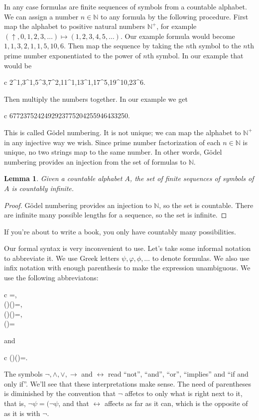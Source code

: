 \documentclass[11pt,oneside,%
]{memoir}
\newenvironment{eqna}{\begin{IEEEeqnarray}{c}}{\end{IEEEeqnarray}\ignorespacesafterend}
\newtheorem{lemma}{Lemma}
\theoremstyle{definition}
\newcommand{\NN}{\mathbb{N}}
\begin{document}
In any case formulas are finite sequences of symbols from a countable alphabet. We can assign a number \(n\in\NN\) to any formula by the following procedure. First map the alphabet to positive natural numbers \(\NN^+\), for example \((\uparrow,0,1,2,3,\dotsc)\mapsto(1,2,3,4,5,\dotsc)\). Our example formula would become \(1,1,3,2,1,1,5,10,6\). Then map the sequence  by taking the \(n\)th symbol to the \(n\)th prime number exponentiated to the power of \(n\)th symbol. In our example that would be
\begin{eqna}
    2^1,3^1,5^3,7^2,11^1,13^1,17^5,19^{10},23^6.
\end{eqna}
Then multiply the numbers together. In our example we get
\begin{eqna}
    6772375242492923775204255946433250.
\end{eqna}

This is called Gödel numbering. It is not unique; we can map the alphabet to \(\NN^+\) in any injective way we wish. Since prime number factorization of each \(n\in\NN\) is unique, no two strings map to the same number. In other words, Gödel numbering provides an injection from the set of formulas to \(\NN\).
\begin{lemma}
Given a countable alphabet \(A\), the set of finite sequences of symbols of \(A\) is countably infinite.
\end{lemma}
\begin{proof}
Gödel numbering provides an injection to \(\NN\), so the set is countable. There are infinite many possible lengths for a sequence, so the set is infinite.
\end{proof}
If you're about to write a book, you only have countably many possibilities.

Our formal syntax is very inconvenient to use. Let's take some informal notation to abbreviate it. We use Greek letters \(\psi,\varphi,\phi,\dotsc\) to denote formulas. We also use infix notation with enough parenthesis to make the expression unambiguous. We use the following abbreviatons:
\begin{eqna}
    {\psi\uparrow\psi}=\neg\psi,\nonumber\\
    (\psi\uparrow\xi)\uparrow(\psi\uparrow\xi)=\psi\wedge\xi,\nonumber\\
    (\psi\uparrow\psi)\uparrow(\xi\uparrow\xi)=\psi\vee\xi,\nonumber\\
    \psi\uparrow(\xi\uparrow\xi)=\psi\rightarrow\xi\nonumber
\end{eqna}
and
\begin{eqna}
    (\psi\rightarrow\xi)\wedge(\xi\rightarrow\psi)=\psi\leftrightarrow\xi.\nonumber
\end{eqna}
The symbols \(\neg,\wedge,\vee,\rightarrow\) and \(\leftrightarrow\) read ``not'', ``and'', ``or'', ``implies'' and ``if and only if''. We'll see that these interpretations make sense. The need of parentheses is diminished by the convention that \(\neg\) affetcs to only what is right next to it, that is, \(\neg\psi=(\neg\psi\), and that \(\leftrightarrow\) affects as far as it can, which is the opposite of as it is with \(\neg\).
\end{document}
